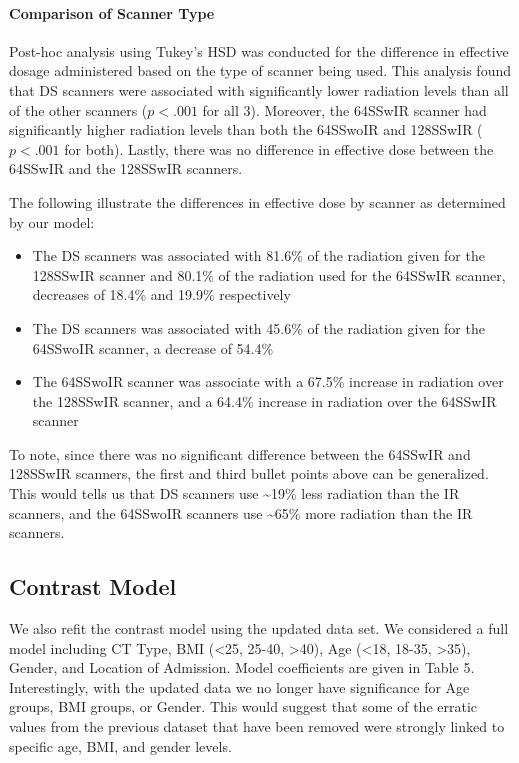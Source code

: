 \documentclass[]{article}
\let\oldparagraph\paragraph
\renewcommand{\paragraph}[1]{\oldparagraph{#1}\mbox{}}
\begin{document}
\paragraph{Comparison of Scanner Type}\label{comparison-of-scanner-type}

Post-hoc analysis using Tukey's HSD was conducted for the difference in
effective dosage administered based on the type of scanner being used.
This analysis found that DS scanners were associated with significantly
lower radiation levels than all of the other scanners (\(p < .001\) for
all 3). Moreover, the 64SSwIR scanner had significantly higher radiation
levels than both the 64SSwoIR and 128SSwIR (\(p<.001\) for both).
Lastly, there was no difference in effective dose between the 64SSwIR
and the 128SSwIR scanners.

The following illustrate the differences in effective dose by scanner as
determined by our model:

\begin{itemize}
\item The DS scanners was associated with 81.6\% of the radiation given for the 128SSwIR scanner and 80.1\% of the radiation used for the 64SSwIR scanner, decreases of 18.4\% and 19.9\% respectively
\item The DS scanners was associated with 45.6\% of the radiation given for the 64SSwoIR scanner, a decrease of 54.4\%
\item The 64SSwoIR scanner was associate with a 67.5\% increase in radiation over the 128SSwIR scanner, and a 64.4\% increase in radiation over the 64SSwIR scanner 
\end{itemize}

To note, since there was no significant difference between the 64SSwIR
and 128SSwIR scanners, the first and third bullet points above can be
generalized. This would tells us that DS scanners use
\textasciitilde{}19\% less radiation than the IR scanners, and the
64SSwoIR scanners use \textasciitilde{}65\% more radiation than the IR
scanners.

\subsection{Contrast Model}\label{contrast-model}

We also refit the contrast model using the updated data set. We
considered a full model including CT Type, BMI (\textless{}25, 25-40,
\textgreater{}40), Age (\textless{}18, 18-35, \textgreater{}35), Gender,
and Location of Admission. Model coefficients are given in Table 5.
Interestingly, with the updated data we no longer have significance for
Age groups, BMI groups, or Gender. This would suggest that some of the
erratic values from the previous dataset that have been removed were
strongly linked to specific age, BMI, and gender levels.
\end{document}
